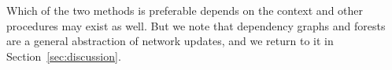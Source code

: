 Which of the two methods is preferable depends on the context and other procedures may exist as well. But we note that dependency graphs and forests are a general abstraction of network updates, and we return to it in Section~\ref{sec:discussion}.





